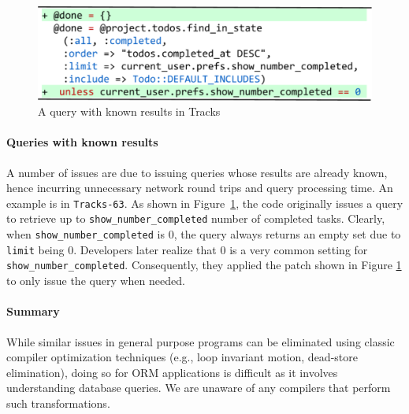 \begin{figure}

  \centering
  \includegraphics[width=0.7\columnwidth]{hownotto/tracks63}
  \caption{A query with known results in Tracks}
  \label{fig:tracks63}
\end{figure}

\vspace{-0.08in} 
\paragraph{\bf{Queries with known results}}
A number of issues are due to issuing queries whose results are already known, hence incurring unnecessary network round trips and query processing time.
%
An example is in \texttt{Tracks-63}. As shown in Figure~\ref{fig:tracks63},
the code originally issues a query to retrieve up to 
\texttt{show\_number\_completed} number of completed tasks. Clearly, when \texttt{show\_number\_completed} is $0$, the query always returns an empty set due to {\tt limit} being $0$.
Developers later realize
that $0$ is a very common setting for \texttt{show\_number\_completed}. 
Consequently, they applied the patch shown in Figure \ref{fig:tracks63} to only issue the query when needed. 

\vspace{-0.08in} 
\paragraph{\bf{Summary}}
While similar issues in general purpose programs can be eliminated using classic compiler optimization techniques (e.g., loop invariant motion, dead-store elimination), doing so for ORM applications is difficult as it involves understanding database queries.
We are unaware of any compilers that perform such transformations.

